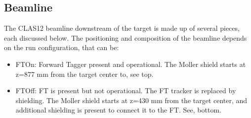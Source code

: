 \subsection{Beamline}

The CLAS12 beamline downstream of the target is made up of several pieces, each discussed below. The positioning and composition of the beamline
depends on the run configuration, that can be:

\begin{itemize}
	\item FTOn: Forward Tagger present and operational. The Moller shield starts at z=877 mm from the target center to, see  top.
	\item FTOff: FT is present but not operational. The FT tracker is replaced by shielding.
                 The Moller shield starts at z=430 mm from the target center, and additional shielding is present to connect it to the FT. See,  bottom.
\end{itemize}


